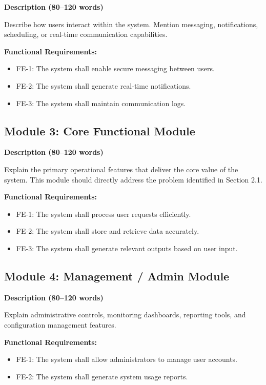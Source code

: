\textbf{Description (80–120 words)}

Describe how users interact within the system. Mention messaging, 
notifications, scheduling, or real-time communication capabilities.

\textbf{Functional Requirements:}

\begin{itemize}
    \item FE-1: The system shall enable secure messaging between users.
    \item FE-2: The system shall generate real-time notifications.
    \item FE-3: The system shall maintain communication logs.
\end{itemize}



\subsection{Module 3: Core Functional Module}

\textbf{Description (80–120 words)}

Explain the primary operational features that deliver the core 
value of the system. This module should directly address the 
problem identified in Section 2.1.

\textbf{Functional Requirements:}

\begin{itemize}
    \item FE-1: The system shall process user requests efficiently.
    \item FE-2: The system shall store and retrieve data accurately.
    \item FE-3: The system shall generate relevant outputs based on user input.
\end{itemize}



\subsection{Module 4: Management / Admin Module}

\textbf{Description (80–120 words)}

Explain administrative controls, monitoring dashboards, reporting 
tools, and configuration management features.

\textbf{Functional Requirements:}

\begin{itemize}
    \item FE-1: The system shall allow administrators to manage user accounts.
    \item FE-2: The system shall generate system usage reports.
\end{itemize}



